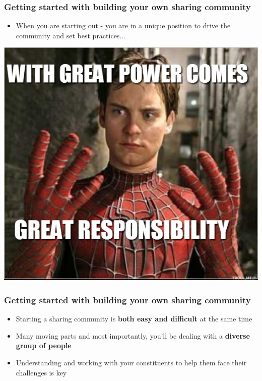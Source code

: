 \begin{frame}
	\frametitle{Getting started with building your own sharing community}
	\begin{itemize}
		\item When you are starting out - you are in a unique position to drive the community and set best practices...
	\end{itemize}
	\centering\includegraphics[scale=0.3]{../images/power-responsibility.png}
\end{frame}

\begin{frame}
	\frametitle{Getting started with building your own sharing community}
	\begin{itemize}
		\item Starting a sharing community is \textbf{both easy and difficult} at the same time
		\item Many moving parts and most importantly, you'll be dealing with a \textbf{diverse group of people}
		\item Understanding and working with your constituents to help them face their challenges is key
	\end{itemize}
\end{frame}

